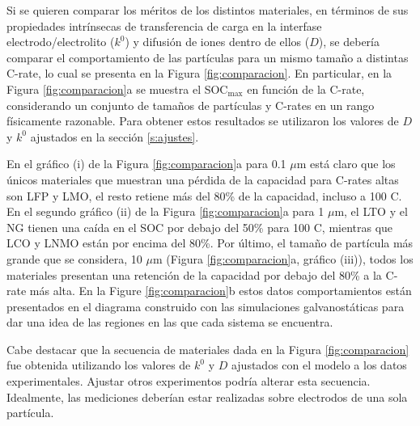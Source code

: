 Si se quieren comparar los méritos de los distintos materiales, en términos de 
sus propiedades intrínsecas de transferencia de carga en la interfase 
electrodo/electrolito ($k^0$) y difusión de iones dentro de ellos ($D$), se 
debería comparar el comportamiento de las partículas para un mismo tamaño a 
distintas C-rate, lo cual se presenta en la Figura \ref{fig:comparacion}. En 
particular, en la Figura \ref{fig:comparacion}a se muestra el SOC$_{\max}$ 
en función de la C-rate, considerando un conjunto de tamaños de partículas y 
C-rates en un rango físicamente razonable. Para obtener estos resultados se 
utilizaron los valores de $D$ y $k^0$ ajustados en la sección \ref{s:ajustes}.

En el gráfico (i) de la Figura \ref{fig:comparacion}a para 0.1 $\mu$m está
claro que los únicos materiales que muestran una pérdida de la capacidad para
C-rates altas son LFP y LMO, el resto retiene más del 80\% de la capacidad, 
incluso a 100 C. En el segundo gráfico (ii) de la Figura
\ref{fig:comparacion}a para 1 $\mu$m, el LTO y el NG tienen
una caída en el SOC por debajo del 50\% para 100 C, mientras que LCO y LNMO
están por encima del 80\%. Por último, el tamaño de partícula más grande que se 
considera, 10 $\mu$m (Figura \ref{fig:comparacion}a, gráfico (iii)), 
todos los materiales presentan una retención de la capacidad por debajo del 80\%
a la C-rate más alta. En la Figure \ref{fig:comparacion}b estos datos 
comportamientos están presentados en el diagrama construido con las simulaciones
galvanostáticas para dar una idea de las regiones en las que cada sistema se
encuentra. 

Cabe destacar que la secuencia de materiales dada en la Figura 
\ref{fig:comparacion} fue obtenida utilizando los valores de $k^0$ y $D$ 
ajustados con el modelo a los datos experimentales. Ajustar otros experimentos
podría alterar esta secuencia. Idealmente, las mediciones deberían estar 
realizadas sobre electrodos de una sola partícula.

